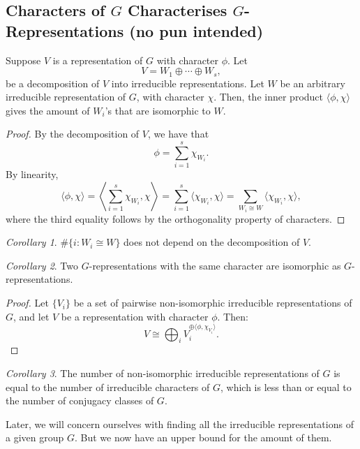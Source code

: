 \documentclass[a4paper]{report}
\theoremstyle{definition}
\theoremstyle{remark}
\theoremstyle{proposition}
\theoremstyle{conjecture}
\theoremstyle{lemma}
\theoremstyle{corollary}
\newtheorem{corollary}{Corollary}
\theoremstyle{exercise}
\theoremstyle{example}
\begin{document}
\subsection{Characters of $G$ Characterises $G$-Representations (no pun intended)}

\begin{theorem}
    Suppose $V$ is a representation of $G$ with character $\phi$. Let
    $$V = W_1\oplus \cdots \oplus W_s,$$ be a decomposition of $V$ into irreducible
    representations. Let $W$ be an arbitrary irreducible representation of $G$,
    with character $\chi$. 
    Then, the inner product $\langle \phi,\chi\rangle$ gives the amount of 
    $W_i$'s that are isomorphic to $W$.
\end{theorem}

\begin{proof}
    By the decomposition of $V$, we have that 
    $$\phi = \sum_{i=1}^s \chi_{W_i}.$$
    By linearity, 
    $$\langle\phi,\chi\rangle = \left\langle \sum_{i=1}^s \chi_{W_i},\chi\right\rangle = \sum_{i=1}^s \langle \chi_{W_i},\chi\rangle = \sum_{W_i\cong W} \langle \chi_{W_i},\chi\rangle,$$
    where the third equality follows by the orthogonality property 
    of characters. 
\end{proof}

\begin{corollary}
    $\# \lbrace i: W_i\cong W\rbrace$ does not depend on the decomposition of 
    $V$.
\end{corollary}

\begin{corollary}
    Two $G$-representations with the same character are isomorphic as 
    $G$-representations. 
\end{corollary}

\begin{proof}
    Let $\lbrace V_i\rbrace$ be a set of pairwise 
    non-isomorphic irreducible representations of $G$, and let 
    $V$ be a representation with character $\phi$. Then:
    $$V \cong \bigoplus_iV_i^{\oplus \langle \phi,\chi_{V_i}\rangle}.$$
\end{proof}

\begin{corollary}
    The number of non-isomorphic irreducible representations of $G$ is equal 
    to the number of irreducible characters of $G$, which is less than 
    or equal to the number of conjugacy classes of $G$.
\end{corollary}

Later, we will concern ourselves with finding all the irreducible representations
of a given group $G$. But we now have an upper bound for the amount of them.
\end{document}
